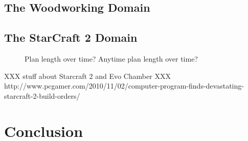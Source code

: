 \documentclass[letterpaper]{article}
\theoremstyle{plain} \newtheorem{theorem}{Theorem} \newtheorem{proposition}{Proposition} \newtheorem{lemma}{Lemma}
\theoremstyle{definition} \newtheorem{definition}{Definition} \newtheorem{conjecture}{Conjecture} \newtheorem*{example}{Example}
\theoremstyle{remark} \newtheorem*{remark}{Remark} \newtheorem*{note}{Note} \newtheorem{case}{Case}
\begin{document}
\subsection{The Woodworking Domain}
\subsection{The StarCraft 2 Domain}
\begin{figure}
  \caption{Plan length over time? Anytime plan length over time?}
\end{figure}

XXX stuff about Starcraft 2 and Evo Chamber
XXX http://www.pcgamer.com/2010/11/02/computer-program-finds-devastating-starcraft-2-build-orders/

\section{Conclusion}



\end{document}
